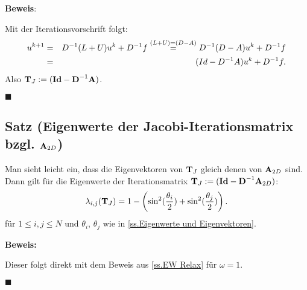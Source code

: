 \textbf{Beweis}:

Mit der Iterationsvorschrift folgt:
\begin{eqnarray}
u^{k+1} &=& D^{-1}(L+U)u^{k} + D^{-1}f \overset{(L+U)=(D-A)}{=} D^{-1}(D-A)u^{k}+D^{-1}f \notag \\
&=& (Id-D^{-1}A)u^{k} + D^{-1}f. \notag
\end{eqnarray}
Also ${\textbf{T}}_{J} := ({\textbf{Id}} - {\textbf{D}}^{-1} {\textbf{A}})$.
\begin{flushright}
$\blacksquare$
\end{flushright}

\subsection{Satz (Eigenwerte der Jacobi-Iterationsmatrix bzgl. ${\textbf{A}}_{2D}$)}\label{ss.EW Jacobi}

Man sieht leicht ein, dass die Eigenvektoren von ${\textbf{T}}_{J}$ gleich denen von ${\textbf{A}}_{2D}$ sind. Dann gilt für die Eigenwerte der Iterationsmatrix ${\textbf{T}}_{J} := ({\textbf{Id}} - {\textbf{D}}^{-1}{\textbf{A}}_{2D})$:
\begin{equation}
\lambda_{i,j}({\textbf{T}}_{J}) = 1 - \left(\sin^{2}(\frac {\theta_{i}} {2}) + \sin^{2}(\frac {\theta_{j}} {2}) \right). \label{eq.Jacobi-Eigenwerte}
\end{equation}
für $1 \le i,j \le N$ und $\theta_{i}$, $\theta_{j}$ wie in \autoref{ss.Eigenwerte und Eigenvektoren}.

\textbf{Beweis:}\label{b.EW Jacobi}

Dieser folgt direkt mit dem Beweis aus \autoref{ss.EW Relax} für $\omega = 1$.
\begin{flushright}
$\blacksquare$
\end{flushright}


